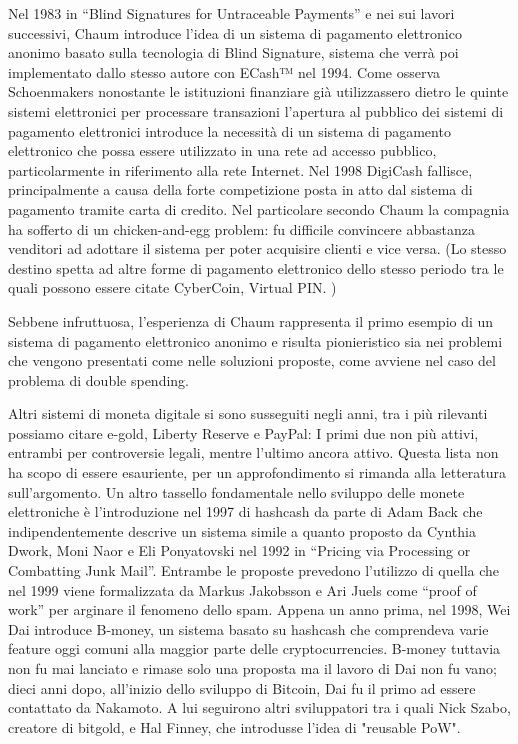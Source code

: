 Nel 1983 in “Blind Signatures for Untraceable Payments” e nei sui lavori successivi, Chaum introduce l’idea di un sistema di pagamento elettronico anonimo basato sulla tecnologia di Blind Signature, sistema che verrà poi implementato dallo stesso autore con ECash™ nel 1994. Come osserva Schoenmakers nonostante le istituzioni finanziare già utilizzassero dietro le quinte sistemi elettronici per processare transazioni l’apertura al pubblico dei sistemi di pagamento elettronici introduce la necessità di un sistema di pagamento elettronico che possa essere utilizzato in una rete ad accesso pubblico, particolarmente in riferimento alla rete Internet. Nel 1998 DigiCash fallisce, principalmente a causa della forte competizione posta in atto dal sistema di pagamento tramite carta di credito. Nel particolare secondo Chaum la compagnia ha sofferto di un chicken-and-egg problem: fu difficile convincere abbastanza venditori  ad adottare il sistema per  poter acquisire clienti e vice versa. (Lo stesso destino spetta ad altre forme di pagamento elettronico dello stesso periodo tra le quali possono essere citate CyberCoin, Virtual PIN. ) 


Sebbene infruttuosa, l’esperienza di Chaum rappresenta il primo esempio di un sistema di pagamento elettronico anonimo e risulta pionieristico sia nei problemi che vengono presentati come nelle soluzioni proposte, come avviene nel caso del problema di double spending. 


Altri sistemi di moneta digitale si sono susseguiti negli anni, tra i più rilevanti possiamo citare e-gold, Liberty Reserve e PayPal: I primi due non più attivi, entrambi per controversie legali, mentre l’ultimo ancora attivo. Questa lista non ha scopo di essere esauriente, per un approfondimento si rimanda alla letteratura sull’argomento.
Un altro tassello fondamentale nello sviluppo delle monete elettroniche è l’introduzione nel 1997 di hashcash da parte di Adam Back che indipendentemente descrive un sistema simile a quanto proposto da Cynthia Dwork,  Moni Naor e Eli Ponyatovski nel 1992 in “Pricing via Processing or Combatting Junk Mail”. Entrambe le proposte prevedono l’utilizzo di quella che nel 1999 viene formalizzata da  Markus Jakobsson e Ari Juels come “proof of work” per arginare il fenomeno dello spam. Appena un anno prima, nel 1998, Wei Dai introduce B-money, un sistema basato su hashcash che comprendeva varie feature oggi comuni alla maggior parte delle cryptocurrencies. B-money tuttavia non fu mai lanciato e rimase solo una proposta ma il lavoro di Dai non fu vano; dieci anni dopo, all'inizio dello sviluppo di Bitcoin, Dai fu il primo ad essere contattato da Nakamoto. A lui seguirono altri sviluppatori tra i quali Nick Szabo, creatore di bitgold, e Hal Finney, che introdusse l'idea di "reusable PoW". 

